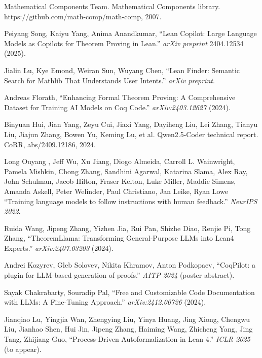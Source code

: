 \documentclass[11pt,a4paper]{article}
\begin{document}
\newpage

\begin{thebibliography}{9}

    Mathematical Components Team. Mathematical Components library.
    https://github.com/math-comp/math-comp, 2007.
    
    Peiyang Song, Kaiyu Yang, Anima Anandkumar,
    ``Lean Copilot: Large Language Models as Copilots for Theorem Proving in Lean.''
    \emph{arXiv preprint} 2404.12534 (2025).

    Jialin Lu, Kye Emond, Weiran Sun, Wuyang Chen,
    ``Lean Finder: Semantic Search for Mathlib That Understands User Intents.''
    \emph{arXiv preprint}.

    Andreas Florath,
    ``Enhancing Formal Theorem Proving: A Comprehensive Dataset for Training AI Models on Coq Code.''
    \emph{arXiv:2403.12627} (2024).

    Binyuan Hui, Jian Yang, Zeyu Cui, Jiaxi Yang, Dayiheng Liu, Lei Zhang, Tianyu Liu, Jiajun Zhang, Bowen
Yu, Keming Lu, et al. Qwen2.5-Coder technical report. CoRR, abs/2409.12186, 2024.

    Long Ouyang , Jeff Wu, Xu Jiang, Diogo Almeida, Carroll L. Wainwright, Pamela Mishkin, Chong Zhang, Sandhini Agarwal, Katarina Slama, Alex Ray, John Schulman, Jacob Hilton, Fraser Kelton, Luke Miller, Maddie Simens, Amanda Askell, Peter Welinder, Paul Christiano, Jan Leike, Ryan Lowe
    ``Training language models to follow instructions with human feedback.''
    \emph{NeurIPS 2022}.

    Ruida Wang, Jipeng Zhang, Yizhen Jia, Rui Pan, Shizhe Diao, Renjie Pi, Tong Zhang,
    ``TheoremLlama: Transforming General-Purpose LLMs into Lean4 Experts.''
    \emph{arXiv:2407.03203} (2024).

    Andrei Kozyrev, Gleb Solovev, Nikita Khramov, Anton Podkopaev,
    ``CoqPilot: a plugin for LLM-based generation of proofs.''
    \emph{AITP 2024} (poster abstract).

    Sayak Chakrabarty, Souradip Pal,
    ``Free and Customizable Code Documentation with LLMs: A Fine-Tuning Approach.''
    \emph{arXiv:2412.00726} (2024).

    Jianqiao Lu, Yingjia Wan, Zhengying Liu, Yinya Huang, Jing Xiong, Chengwu Liu, Jianhao Shen, Hui Jin, Jipeng Zhang, Haiming Wang, Zhicheng Yang, Jing Tang, Zhijiang Guo,
    ``Process-Driven Autoformalization in Lean 4.''
    \emph{ICLR 2025} (to appear).


\end{thebibliography}
\end{document}
